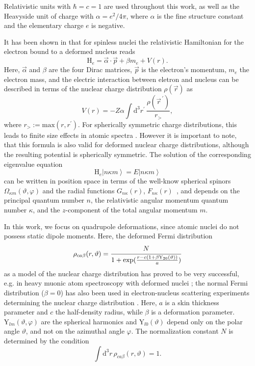 Relativistic units with ${\hbar}{=}{c}{=}{1}$ are used throughout this work, as well as the Heavyside unit of charge with ${\alpha}{=}{e^2}/{4\pi}$, where $\alpha$ is the fine structure constant and the elementary charge $e$ is negative.


It has been shown in \cite{kozhedub2008} that for spinless nuclei the relativistic Hamiltonian for the electron bound to a deformed nucleus reads
\begin{equation}
\text{H}_{e}=\vec{\alpha}\cdot\vec{p} + \beta m_e + V(r).
\label{eq:Hboundel}
\end{equation}
Here, $\vec{\alpha}$ and $\beta$ are the four Dirac matrices, $\vec{p}$ is the electron's momentum, $m_e$ the electron mass, and the electric interaction between eletron and nucleus can be described in terms of the nuclear charge distribution $\rho(\vec{r})$ as
\begin{equation}
V(r) = -Z \alpha \int \text{d}^3r^{'}\,\frac{\rho(\vec{r}^{\,'})}{r_>},
\label{eq:potdef}
\end{equation}
where ${r_>}{:=}{\text{max}(r,r^{'})}$. For spherically symmetric charge distributions, this leads to finite size effects in atomic spectra \cite{Shabaev1993}. However it is important to note, that this formula is also valid for deformed nuclear charge distributions, although the resulting potential is spherically symmetric. The solution of the corresponding eigenvalue equation
\begin{equation}
\text{H}_{e} \left| n\kappa m \right> = E \left| n \kappa m \right>
\label{eq:diraceq_2}
\end{equation}
can be written in position space in terms of the well-know spherical spinors $\Omega_{\kappa m}(\vartheta,\varphi)$ and the radial functions $G_{n\kappa}(r)$, $F_{n\kappa}(r)$~\cite{greiner2000}, and depends on the principal quantum number $n$, the relativistic angular momentum quantum number $\kappa$, and the $z$-component of the total angular momentum $m$.

In this work, we focus on quadrupole deformations, since atomic nuclei do not possess static dipole moments. Here, the deformed Fermi distribution
\begin{equation}
\rho_{ca\beta}(r,\vartheta)=\cfrac{N}{1+\text{exp}(\frac{r-c(1+\beta \text{Y}_{20}(\vartheta))}{a})}
\label{eq:deffermi}
\end{equation}
as a model of the nuclear charge distribution has proved to be very successful, e.g. in heavy muonic atom spectroscopy with deformed nuclei \cite{hitlin1970,tanaka1984}; the normal Fermi distribution (${\beta}{=}{0}$) has also been used in electron-nucleus scattering experiments determining the nuclear charge distribution \cite{hahn1956}. Here, $a$ is a skin thickness parameter and $c$ the half-density radius, while $\beta$ is a deformation parameter. $\text{Y}_{lm}(\vartheta,\varphi)$ are the spherical harmonics and $\text{Y}_{l0}(\vartheta)$ depend only on the polar angle $\vartheta$, and not on the azimuthal angle $\varphi$. The normalization constant $N$ is determined by the condition
\begin{equation}
\int \text{d}^3r\, \rho_{ca\beta}(r,\vartheta)=1.
\end{equation}



